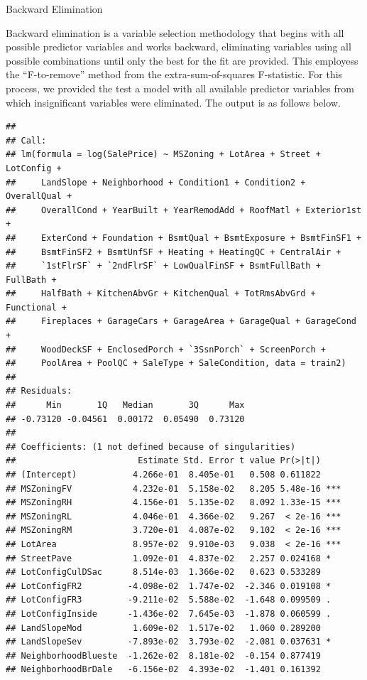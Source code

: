 \documentclass[american,]{article}
\theoremstyle{definition}
\theoremstyle{definition}
\theoremstyle{definition}
\theoremstyle{remark}
\begin{document}
Backward Elimination

Backward elimination is a variable selection methodology that begins
with all possible predictor variables and works backward, eliminating
variables using all possible combinations until only the best for the
fit are provided. This employess the ``F-to-remove'' method from the
extra-sum-of-squares F-statistic. For this process, we provided the test
a model with all available predictor variables from which insignificant
variables were eliminated. The output is as follows below.

\begin{verbatim}
## 
## Call:
## lm(formula = log(SalePrice) ~ MSZoning + LotArea + Street + LotConfig + 
##     LandSlope + Neighborhood + Condition1 + Condition2 + OverallQual + 
##     OverallCond + YearBuilt + YearRemodAdd + RoofMatl + Exterior1st + 
##     ExterCond + Foundation + BsmtQual + BsmtExposure + BsmtFinSF1 + 
##     BsmtFinSF2 + BsmtUnfSF + Heating + HeatingQC + CentralAir + 
##     `1stFlrSF` + `2ndFlrSF` + LowQualFinSF + BsmtFullBath + FullBath + 
##     HalfBath + KitchenAbvGr + KitchenQual + TotRmsAbvGrd + Functional + 
##     Fireplaces + GarageCars + GarageArea + GarageQual + GarageCond + 
##     WoodDeckSF + EnclosedPorch + `3SsnPorch` + ScreenPorch + 
##     PoolArea + PoolQC + SaleType + SaleCondition, data = train2)
## 
## Residuals:
##      Min       1Q   Median       3Q      Max 
## -0.73120 -0.04561  0.00172  0.05490  0.73120 
## 
## Coefficients: (1 not defined because of singularities)
##                        Estimate Std. Error t value Pr(>|t|)    
## (Intercept)           4.266e-01  8.405e-01   0.508 0.611822    
## MSZoningFV            4.232e-01  5.158e-02   8.205 5.48e-16 ***
## MSZoningRH            4.156e-01  5.135e-02   8.092 1.33e-15 ***
## MSZoningRL            4.046e-01  4.366e-02   9.267  < 2e-16 ***
## MSZoningRM            3.720e-01  4.087e-02   9.102  < 2e-16 ***
## LotArea               8.957e-02  9.910e-03   9.038  < 2e-16 ***
## StreetPave            1.092e-01  4.837e-02   2.257 0.024168 *  
## LotConfigCulDSac      8.514e-03  1.366e-02   0.623 0.533289    
## LotConfigFR2         -4.098e-02  1.747e-02  -2.346 0.019108 *  
## LotConfigFR3         -9.211e-02  5.588e-02  -1.648 0.099509 .  
## LotConfigInside      -1.436e-02  7.645e-03  -1.878 0.060599 .  
## LandSlopeMod          1.609e-02  1.517e-02   1.060 0.289200    
## LandSlopeSev         -7.893e-02  3.793e-02  -2.081 0.037631 *  
## NeighborhoodBlueste  -1.262e-02  8.181e-02  -0.154 0.877419    
## NeighborhoodBrDale   -6.156e-02  4.393e-02  -1.401 0.161392    

\end{verbatim}
\end{document}
